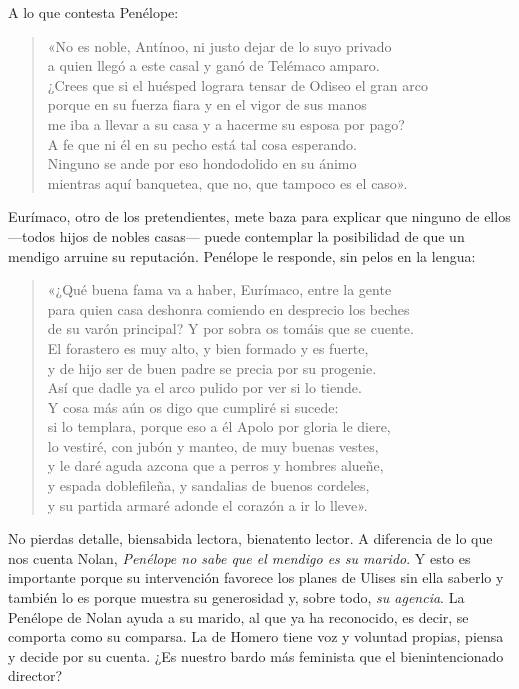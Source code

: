 A lo que contesta Penélope:

\begin{verse}
«No es noble, Antínoo, ni justo dejar de lo suyo privado\\
a quien llegó a este casal y ganó de Telémaco amparo.\\
¿Crees que si el huésped lograra tensar de Odiseo el gran arco\\
porque en su fuerza fiara y en el vigor de sus manos\\
me iba a llevar a su casa y a hacerme su esposa por pago?\\
A fe que ni él en su pecho está tal cosa esperando.\\
Ninguno se ande por eso hondodolido en su ánimo\\
mientras aquí banquetea, que no, que tampoco es el caso».
\end{verse}

Eurímaco, otro de los pretendientes, mete baza para explicar que ninguno de ellos ---todos hijos de nobles casas--- puede contemplar la posibilidad de que un mendigo arruine su reputación. Penélope le responde, sin pelos en la lengua:

\begin{verse}
«¿Qué buena fama va a haber, Eurímaco, entre la gente\\
para quien casa deshonra comiendo en desprecio los beches\\
de su varón principal? Y por sobra os tomáis que se cuente.\\
El forastero es muy alto, y bien formado y es fuerte,\\
y de hijo ser de buen padre se precia por su progenie.\\
Así que dadle ya el arco pulido por ver si lo tiende.\\
Y cosa más aún os digo que cumpliré si sucede:\\
si lo templara, porque eso a él Apolo por gloria le diere,\\
lo vestiré, con jubón y manteo, de muy buenas vestes,\\
y le daré aguda azcona que a perros y hombres alueñe,\\
y espada doblefileña, y sandalias de buenos cordeles,\\
y su partida armaré adonde el corazón a ir lo lleve».
\end{verse}

No pierdas detalle, biensabida lectora, bienatento lector. A diferencia de lo que nos cuenta Nolan, \emph{Penélope no sabe que el mendigo es su marido}. Y esto es importante porque su intervención favorece los planes de Ulises sin ella saberlo y también lo es porque muestra su generosidad y, sobre todo, \emph{su agencia}. La Penélope de Nolan ayuda a su marido, al que ya ha reconocido, es decir, se comporta como su comparsa. La de Homero tiene voz y voluntad propias, piensa y decide por su cuenta. ¿Es nuestro bardo más feminista que el bienintencionado director?

